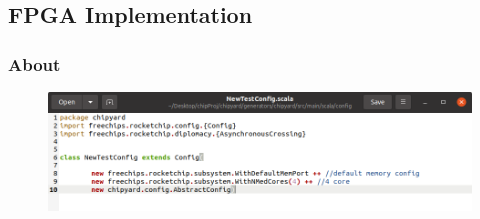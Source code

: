 
\subsection{FPGA Implementation}


\subsubsection{About}


\begin{figure}[h!tbp]
  \centering
  \includegraphics[width=0.7\linewidth]{./NewTestConfig.png}
  \caption{}
  \label{fig:newtestconfig}
\end{figure}

